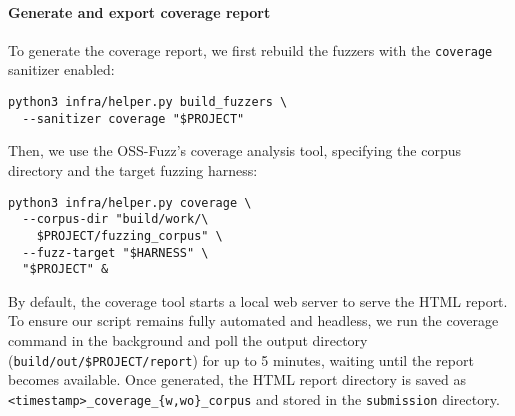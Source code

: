 \noindent \paragraph{Generate and export coverage report}

To generate the coverage report, we first rebuild the fuzzers with the \texttt{coverage} sanitizer enabled:

\begin{verbatim}
python3 infra/helper.py build_fuzzers \
  --sanitizer coverage "$PROJECT"
\end{verbatim}

Then, we use the OSS-Fuzz's coverage analysis tool, specifying the corpus directory and the target fuzzing harness:

\begin{verbatim}
python3 infra/helper.py coverage \
  --corpus-dir "build/work/\
    $PROJECT/fuzzing_corpus" \
  --fuzz-target "$HARNESS" \
  "$PROJECT" &
    \end{verbatim}

By default, the coverage tool starts a local web server to serve the HTML report. To ensure our script remains fully automated and headless, we run the coverage command in the background and poll the output directory (\texttt{build/out/\$PROJECT/report}) for up to 5 minutes, waiting until the report becomes available. Once generated, the HTML report directory is saved as \texttt{<timestamp>\_coverage\_{\{w,wo\}\_corpus}} and stored in the \texttt{submission} directory.

